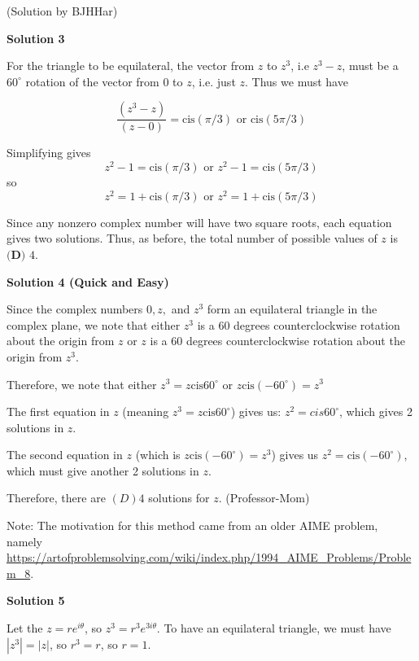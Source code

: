 \begin{enumerate}
(Solution by BJHHar)

 



\textbf{Solution 3}

For the triangle to be equilateral, the vector from $z$ to $z^3$, i.e $z^3 - z$, must be a $60^{\circ}$ rotation of the vector from $0$ to $z$, i.e. just $z$. Thus we must have

 
 \[\frac{(z^3-z)}{(z-0)}=\text{cis}{(\pi/3)} \text{ or } \text{cis}(5\pi/3)\]

 Simplifying gives 
 \[z^2-1= \text{cis}(\pi/3) \text{ or } z^2-1= \text{cis}(5\pi/3)\]so
 \[z^2=1+\text{cis}(\pi/3) \text{ or } z^2=1+\text{cis}(5\pi/3)\]

 Since any nonzero complex number will have two square roots, each equation gives two solutions. Thus, as before, the total number of possible values of $z$ is $\boxed{\textbf{(D) }4}$.

 



\textbf{Solution 4 (Quick and Easy)}

Since the complex numbers $0,z,$ and $z^3$ form an equilateral triangle in the complex plane, we note that either $z^3$ is a 60 degrees counterclockwise rotation about the origin from $z$ or $z$ is a 60 degrees counterclockwise rotation about the origin from $z^3$.

 Therefore, we note that either $z^3 = z \text{cis} 60^\circ{}$ or $z \text{cis}(-60^\circ{}) = z^3$

 The first equation in $z$ (meaning $z^3 = z \text{cis} 60^\circ{}$) gives us: $z^2 = cis 60^\circ{}$, which gives 2 solutions in $z$.

 The second equation in $z$ (which is $z \text{cis} (-60^\circ{}) = z^3$) gives us $z^2 = \text{cis} (-60^\circ{})$, which must give another 2 solutions in $z$.

 Therefore, there are $\boxed{(D) 4}$ solutions for $z$. (Professor-Mom)

 Note: The motivation for this method came from an older AIME problem, namely \href{https://artofproblemsolving.com/wiki/index.php/1994\_AIME\_Problems/Problem\_8}{https://artofproblemsolving.com/wiki/index.php/1994\_AIME\_Problems/Problem\_8}.

 



\textbf{Solution 5}

Let the $z = re^{i\theta}$, so $z^3 = r^3e^{3i\theta}$. To have an equilateral triangle, we must have $|z^3| = |z|$, so $r^3 = r$, so $r= 1$. 


\end{enumerate}
